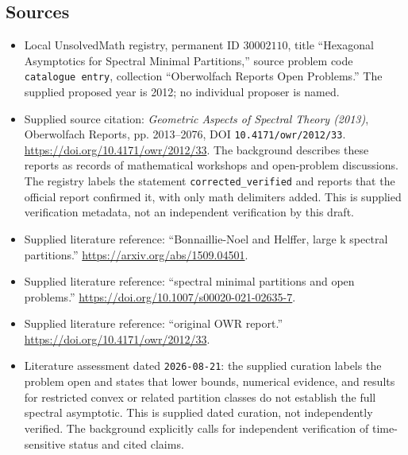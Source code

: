 \documentclass[11pt]{article}
\begin{document}
\subsection{Sources}
\begin{itemize}
\item Local UnsolvedMath registry, permanent ID \(30002110\), title ``Hexagonal Asymptotics for Spectral Minimal Partitions,'' source problem code \texttt{catalogue entry}, collection ``Oberwolfach Reports Open Problems.'' The supplied proposed year is 2012; no individual proposer is named.
\item Supplied source citation: \emph{Geometric Aspects of Spectral Theory (2013)}, Oberwolfach Reports, pp. 2013--2076, DOI \texttt{10.4171/owr/2012/33}. \url{https://doi.org/10.4171/owr/2012/33}. The background describes these reports as records of mathematical workshops and open-problem discussions. The registry labels the statement \texttt{corrected\_verified} and reports that the official report confirmed it, with only math delimiters added. This is supplied verification metadata, not an independent verification by this draft.
\item Supplied literature reference: ``Bonnaillie-Noel and Helffer, large k spectral partitions.'' \url{https://arxiv.org/abs/1509.04501}.
\item Supplied literature reference: ``spectral minimal partitions and open problems.'' \url{https://doi.org/10.1007/s00020-021-02635-7}.
\item Supplied literature reference: ``original OWR report.'' \url{https://doi.org/10.4171/owr/2012/33}.
\item Literature assessment dated \texttt{2026-08-21}: the supplied curation labels the problem open and states that lower bounds, numerical evidence, and results for restricted convex or related partition classes do not establish the full spectral asymptotic. This is supplied dated curation, not independently verified. The background explicitly calls for independent verification of time-sensitive status and cited claims.
\end{itemize}
\end{document}

